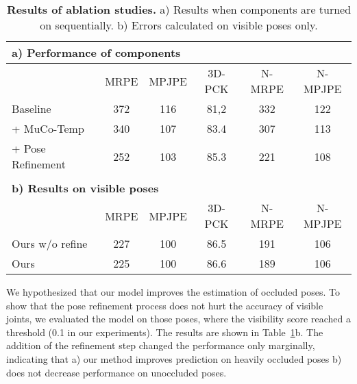 \documentclass[runningheads, envcountsame, a4paper]{llncs}
\begin{document}
\begin{table}[h]
\centering
\caption{\textbf{Results of ablation studies.} a) Results when components are turned on sequentially. b) Errors calculated on visible poses only.}\label{tbl:ablation}
\begin{tabular}{lccccc}
\multicolumn{6}{l}{\textbf{a) Performance of components}} \\
\hline
 & MRPE & MPJPE &  3D-PCK & N-MRPE & N-MPJPE \\
\hline
Baseline & 372 & 116 & 81,2 & 332 & 122 \\
+ MuCo-Temp & 340 & 107  & 83.4 & 307 & 113 \\
+ Pose Refinement & 252 & 103  & 85.3 & 221 & 108 \\ 
\hline
\\
\multicolumn{6}{l}{\textbf{b) Results on visible poses}} \\
\hline
 & MRPE  & MPJPE &  3D-PCK & N-MRPE & N-MPJPE \\
\hline
Ours w/o refine & 227 & 100  & 86.5 & 191 & 106 \\ 
Ours & 225 & 100  & 86.6 & 189 & 106 \\ 
\hline
\end{tabular}
\end{table}

We hypothesized that our model improves the estimation of occluded poses. To show that the pose refinement process does not hurt the accuracy of visible joints, we evaluated the model on those poses, where the visibility score reached a threshold (0.1 in our experiments). The results are shown in Table~\ref{tbl:ablation}b. The addition of the refinement step changed the performance only marginally, indicating that a) our method improves prediction on heavily occluded poses b) does not decrease performance on unoccluded poses.
\end{document}
